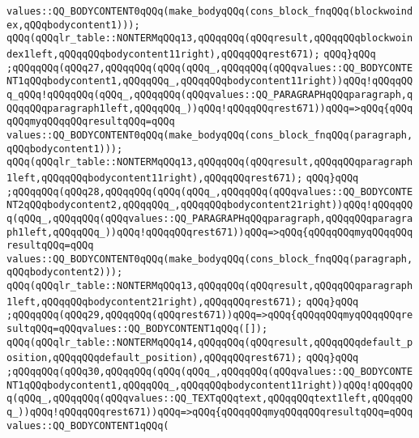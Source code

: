 \verb|values::QQ_BODYCONTENT0qQQq(make_bodyqQQq(cons_block_fnqQQq(blockwoindex,qQQqbodycontent1)));|\newline
\verb|qQQq(qQQqlr_table::NONTERMqQQq13,qQQqqQQq(qQQqresult,qQQqqQQqblockwoindex1left,qQQqqQQqbodycontent11right),qQQqqQQqrest671);|\newline
\verb|qQQq}qQQq|\newline
\verb|;qQQqqQQq(qQQq27,qQQqqQQq(qQQq(qQQq_,qQQqqQQq(qQQqvalues::QQ_BODYCONTENT1qQQqbodycontent1,qQQqqQQq_,qQQqqQQqbodycontent11right))qQQq!qQQqqQQq_qQQq!qQQqqQQq(qQQq_,qQQqqQQq(qQQqvalues::QQ_PARAGRAPHqQQqparagraph,qQQqqQQqparagraph1left,qQQqqQQq_))qQQq!qQQqqQQqrest671))qQQq=>qQQq{qQQqqQQqmyqQQqqQQqresultqQQq=qQQq|\newline
\verb|values::QQ_BODYCONTENT0qQQq(make_bodyqQQq(cons_block_fnqQQq(paragraph,qQQqbodycontent1)));|\newline
\verb|qQQq(qQQqlr_table::NONTERMqQQq13,qQQqqQQq(qQQqresult,qQQqqQQqparagraph1left,qQQqqQQqbodycontent11right),qQQqqQQqrest671);|\newline
\verb|qQQq}qQQq|\newline
\verb|;qQQqqQQq(qQQq28,qQQqqQQq(qQQq(qQQq_,qQQqqQQq(qQQqvalues::QQ_BODYCONTENT2qQQqbodycontent2,qQQqqQQq_,qQQqqQQqbodycontent21right))qQQq!qQQqqQQq(qQQq_,qQQqqQQq(qQQqvalues::QQ_PARAGRAPHqQQqparagraph,qQQqqQQqparagraph1left,qQQqqQQq_))qQQq!qQQqqQQqrest671))qQQq=>qQQq{qQQqqQQqmyqQQqqQQqresultqQQq=qQQq|\newline
\verb|values::QQ_BODYCONTENT0qQQq(make_bodyqQQq(cons_block_fnqQQq(paragraph,qQQqbodycontent2)));|\newline
\verb|qQQq(qQQqlr_table::NONTERMqQQq13,qQQqqQQq(qQQqresult,qQQqqQQqparagraph1left,qQQqqQQqbodycontent21right),qQQqqQQqrest671);|\newline
\verb|qQQq}qQQq|\newline
\verb|;qQQqqQQq(qQQq29,qQQqqQQq(qQQqrest671))qQQq=>qQQq{qQQqqQQqmyqQQqqQQqresultqQQq=qQQqvalues::QQ_BODYCONTENT1qQQq([]);|\newline
\verb|qQQq(qQQqlr_table::NONTERMqQQq14,qQQqqQQq(qQQqresult,qQQqqQQqdefault_position,qQQqqQQqdefault_position),qQQqqQQqrest671);|\newline
\verb|qQQq}qQQq|\newline
\verb|;qQQqqQQq(qQQq30,qQQqqQQq(qQQq(qQQq_,qQQqqQQq(qQQqvalues::QQ_BODYCONTENT1qQQqbodycontent1,qQQqqQQq_,qQQqqQQqbodycontent11right))qQQq!qQQqqQQq(qQQq_,qQQqqQQq(qQQqvalues::QQ_TEXTqQQqtext,qQQqqQQqtext1left,qQQqqQQq_))qQQq!qQQqqQQqrest671))qQQq=>qQQq{qQQqqQQqmyqQQqqQQqresultqQQq=qQQqvalues::QQ_BODYCONTENT1qQQq(|\newline
